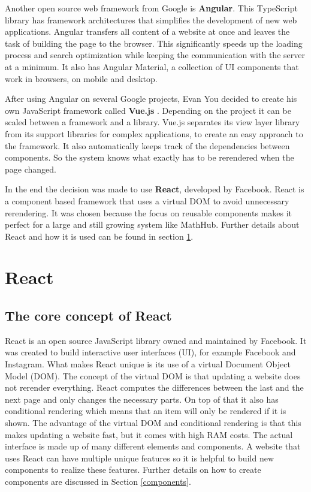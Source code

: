 \documentclass[11pt,a4paper]{article}
\begin{document}
Another open source web framework from Google is \textbf{Angular}\cite{angular}.
This TypeScript library has framework architectures that simplifies the development of new web applications.
Angular transfers all content of a website at once and leaves the task of building the page to the browser.
This significantly speeds up the loading process and search optimization while keeping the communication with the server at a minimum. 
It also has Angular Material, a collection of UI components that work in browsers, on mobile and desktop.

After using Angular on several Google projects, Evan You decided to create his own JavaScript framework called \textbf{Vue.js} \cite{vuewiki}.
Depending on the project it can be scaled between a framework and a library.
Vue.js separates its view layer library from its support libraries for complex applications, to create an easy approach to the framework.
It also automatically keeps track of the dependencies between components.
So the system knows what exactly has to be rerendered when the page changed\cite{vuegit}.

In the end the decision was made to use \textbf{React}, developed by Facebook.
React is a component based framework that uses a virtual DOM to avoid unnecessary rerendering.
It was chosen because the focus on reusable components makes it perfect for a large and still growing system like MathHub.
Further details about React and how it is used can be found in section \ref{react}.


\section{React}\label{react}
\subsection{The core concept of React} 
React is an open source JavaScript library owned and maintained by Facebook.
It was created to build interactive user interfaces (UI), for example Facebook and Instagram.
What makes React unique is its use of a virtual Document Object Model (DOM).
The concept of the virtual DOM is that updating a website does not rerender everything.
React computes the differences between the last and the next page and only changes the necessary parts.
On top of that it also has conditional rendering which means that an item will only be rendered if it is shown.
The advantage of the virtual DOM and conditional rendering is that this makes updating a website fast, but it comes with high RAM costs.
The actual interface is made up of many different elements and components.
A website that uses React can have multiple unique features so it is helpful to build new components to realize these features\cite{reactjs}.
Further details on how to create components are discussed in Section \ref{components}.
\end{document}
